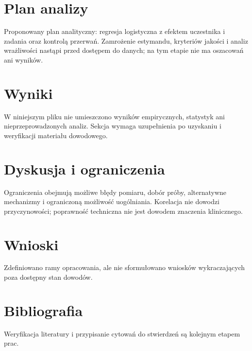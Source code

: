 \documentclass[11pt,a4paper]{article}
\begin{document}
\section{Plan analizy}

Proponowany plan analityczny: regresja logistyczna z efektem uczestnika i zadania oraz kontrolą przerwań. Zamrożenie estymandu, kryteriów jakości i analiz wrażliwości nastąpi przed dostępem do danych; na tym etapie nie ma oszacowań ani wyników.

\section{Wyniki}

W niniejszym pliku nie umieszczono wyników empirycznych, statystyk ani nieprzeprowadzonych analiz. Sekcja wymaga uzupełnienia po uzyskaniu i weryfikacji materiału dowodowego.

\section{Dyskusja i ograniczenia}

Ograniczenia obejmują możliwe błędy pomiaru, dobór próby, alternatywne mechanizmy i ograniczoną możliwość uogólniania. Korelacja nie dowodzi przyczynowości; poprawność techniczna nie jest dowodem znaczenia klinicznego.

\section{Wnioski}

Zdefiniowano ramy opracowania, ale nie sformułowano wniosków wykraczających poza dostępny stan dowodów.

\section*{Bibliografia}

Weryfikacja literatury i przypisanie cytowań do stwierdzeń są kolejnym etapem prac.
\end{document}
